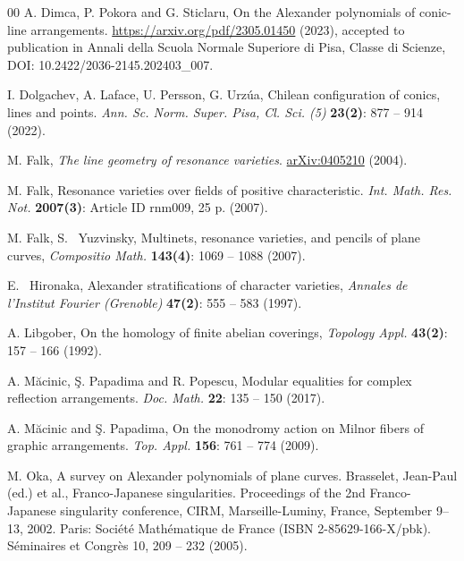 \documentclass[11pt]{amsart}
\theoremstyle{plain}
\theoremstyle{definition}
\begin{document}
\begin{thebibliography}{00}
 A. Dimca, P. Pokora and G. Sticlaru, On the Alexander polynomials of conic-line arrangements. \url{https://arxiv.org/pdf/2305.01450} (2023), accepted to publication in Annali della Scuola Normale Superiore di Pisa, Classe di Scienze, DOI: 10.2422/2036-2145.202403\_007.

I. Dolgachev, A. Laface, U. Persson, G. Urz\'ua,  Chilean configuration of conics, lines and points.  \textit{Ann. Sc. Norm. Super. Pisa, Cl. Sci. (5)} \textbf{23(2)}: 877 -- 914 (2022).

 M. Falk,  {\em The line geometry of resonance varieties}.
 \href{ https://arxiv.org/pdf/math/0405210}{arXiv:0405210} (2004).

 M. Falk, Resonance varieties over ﬁelds of positive characteristic.
\textit{Int. Math. Res. Not.} \textbf{2007(3)}: Article ID rnm009, 25 p. (2007).

 M. Falk,  S. ~Yuzvinsky, Multinets, resonance varieties, and pencils of plane curves, {\it Compositio Math.} {\bf 143(4)}: 1069 -- 1088  (2007).

 E.~ Hironaka, Alexander stratifications of character varieties, {\it Annales de l’Institut Fourier (Grenoble)} {\bf 47(2)}: 555 -- 583 (1997).


 A. Libgober, On the homology of finite abelian coverings, {\it Topology Appl.} {\bf 43(2)}: 157 -- 166 (1992).
 

  A. M\u{a}cinic, \c{S}. Papadima and R. Popescu, Modular equalities for complex reflection arrangements. \textit{Doc. Math.} \textbf{22}: 135 -- 150 (2017).

 A. M\u{a}cinic and \c{S}. Papadima, On the monodromy action on Milnor fibers of graphic arrangements. \textit{Top. Appl.} \textbf{156}: 761 -- 774 (2009). 

M. Oka, A survey on Alexander polynomials of plane curves. Brasselet, Jean-Paul (ed.) et al., Franco-Japanese singularities. Proceedings of the 2nd Franco-Japanese singularity conference, CIRM, Marseille-Luminy, France, September 9–13, 2002. Paris: Société Mathématique de France (ISBN 2-85629-166-X/pbk). Séminaires et Congrès 10, 209 -- 232 (2005).


\end{thebibliography}
\end{document}
